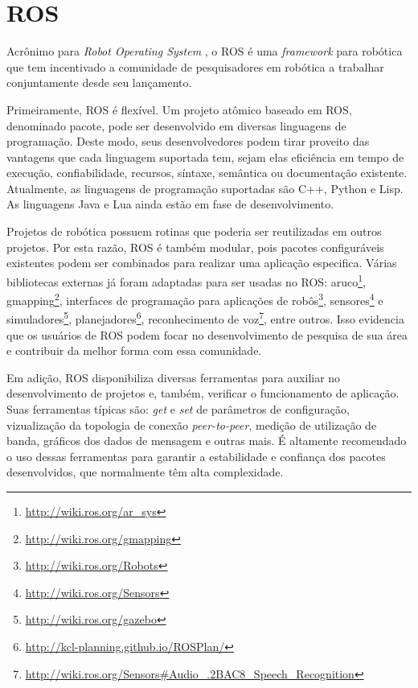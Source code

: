 \chapter[ROS]{ROS} \label{cap:ros}
    
    Acrônimo para \textit{Robot Operating System} \cite{ref:quigley2009ros}, o ROS é uma \textit{framework} para robótica que tem incentivado a comunidade de pesquisadores em robótica a trabalhar conjuntamente desde seu lançamento.
    
    Primeiramente, ROS é flexível. Um projeto atômico baseado em ROS, denominado pacote, pode ser desenvolvido em diversas linguagens de programação. Deste modo, seus desenvolvedores podem tirar proveito das vantagens que cada linguagem suportada tem, sejam elas eficiência em tempo de execução, confiabilidade, recursos, síntaxe, semântica ou documentação existente. Atualmente, as linguagens de programação suportadas são C++, Python e Lisp. As linguagens Java e Lua ainda estão em fase de desenvolvimento.
    
    Projetos de robótica possuem rotinas que poderia ser reutilizadas em outros projetos. Por esta razão, ROS é também modular, pois pacotes configuráveis existentes podem ser combinados para realizar uma aplicação especifica. Várias bibliotecas externas já foram adaptadas para ser usadas no ROS: aruco\footnote{\url{http://wiki.ros.org/ar_sys}}, gmapping\footnote{\url{http://wiki.ros.org/gmapping}}, interfaces de programação para aplicações de robôs\footnote{\url{http://wiki.ros.org/Robots}}, sensores\footnote{\url{http://wiki.ros.org/Sensors}} e simuladores\footnote{\url{http://wiki.ros.org/gazebo}}, planejadores\footnote{\url{http://kcl-planning.github.io/ROSPlan/}}, reconhecimento de voz\footnote{\url{http://wiki.ros.org/Sensors\#Audio_.2BAC8_Speech_Recognition}}, entre outros. Isso evidencia que os usuários de ROS podem focar no desenvolvimento de pesquisa de sua área e contribuir da melhor forma com essa comunidade.
    
    Em adição, ROS disponibiliza diversas ferramentas para auxiliar no desenvolvimento de projetos e, também, verificar o funcionamento de aplicação. Suas ferramentas típicas são: \textit{get} e \textit{set} de parâmetros de configuração, vizualização da topologia de conexão \textit{peer-to-peer}, medição de utilização de banda, gráficos dos dados de mensagem e outras mais. É altamente recomendado o uso dessas ferramentas para garantir a estabilidade e confiança dos pacotes desenvolvidos, que normalmente têm alta complexidade.
    
